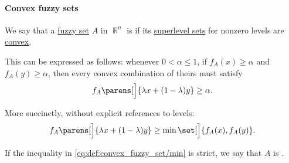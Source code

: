 \paragraph{Convex fuzzy sets}

\begin{definition}\label{def:convex_fuzzy_set}
  We say that a \hyperref[def:fuzzy_set]{fuzzy set} \( A \) in \( \BbbR^n \) is  if its \hyperref[def:level_set]{superlevel sets} for nonzero levels are \hyperref[def:convex_set]{convex}.

  This can be expressed as follows: whenever \( 0 < \alpha \leq 1 \), if \( f_A(x) \geq \alpha \) and \( f_A(y) \geq \alpha \), then every convex combination of theirs must satisfy
  \begin{equation}\label{eq:def:convex_fuzzy_set/superlevel}
    f_A\parens[\Big]{ \lambda x + (1 - \lambda) y } \geq \alpha.
  \end{equation}

  More succinctly, without explicit references to levels:
  \begin{equation}\label{eq:def:convex_fuzzy_set/min}
    f_A\parens[\Big]{ \lambda x + (1 - \lambda) y } \geq \min\set[\Big]{ f_A(x), f_A(y) }.
  \end{equation}

  If the inequality in \eqref{eq:def:convex_fuzzy_set/min} is strict, we say that \( A \) is .
\end{definition}

